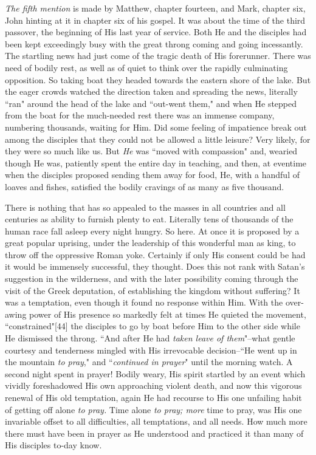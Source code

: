 \textit{The fifth mention} is made by Matthew, chapter fourteen, and Mark,
chapter six, John hinting at it in chapter six of his gospel. It was about
the time of the third passover, the beginning of His last year of service.
Both He and the disciples had been kept exceedingly busy with the great
throng coming and going incessantly. The startling news had just come of
the tragic death of His forerunner. There was need of bodily rest, as well
as of quiet to think over the rapidly culminating opposition. So taking
boat they headed towards the eastern shore of the lake. But the eager
crowds watched the direction taken and spreading the news, literally ``ran"
around the head of the lake and ``out-went them," and when He stepped from
the boat for the much-needed rest there was an immense company, numbering
thousands, waiting for Him. Did some feeling of impatience break out among
the disciples that they could not be allowed a little leisure? Very
likely, for they were so much like us. But \textit{He} was ``moved with
compassion" and, wearied though He was, patiently spent the entire day in
teaching, and then, at eventime when the disciples proposed sending them
away for food, He, with a handful of loaves and fishes, satisfied the
bodily cravings of as many as five thousand.

There is nothing that has so appealed to the masses in all countries and
all centuries as ability to furnish plenty to eat. Literally tens of
thousands of the human race fall asleep every night hungry. So here. At
once it is proposed by a great popular uprising, under the leadership of
this wonderful man as king, to throw off the oppressive Roman yoke.
Certainly if only His consent could be had it would be immensely
successful, they thought. Does this not rank with Satan's suggestion in
the wilderness, and with the later possibility coming through the visit of
the Greek deputation, of establishing the kingdom without suffering? It
was a temptation, even though it found no response within Him. With the
over-awing power of His presence so markedly felt at times He quieted the
movement, ``constrained"[44] the disciples to go by boat before Him to the
other side while He dismissed the throng. ``And after He had \textit{taken leave
of them}"--what gentle courtesy and tenderness mingled with His
irrevocable decision--``He went up in the mountain \textit{to pray}," and
``\textit{continued in prayer}" until the morning watch. A second night spent in
prayer! Bodily weary, His spirit startled by an event which vividly
foreshadowed His own approaching violent death, and now this vigorous
renewal of His old temptation, again He had recourse to His one unfailing
habit of getting off alone \textit{to pray.} Time alone \textit{to pray; more} time to
pray, was His one invariable offset to all difficulties, all temptations,
and all needs. How much more there must have been in prayer as He
understood and practiced it than many of His disciples to-day know.



